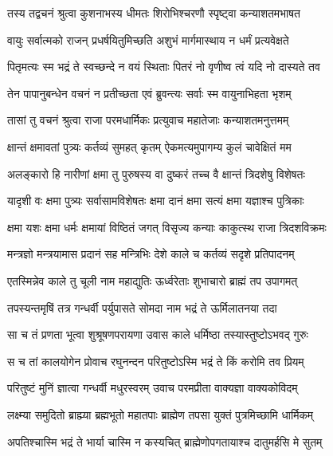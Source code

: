 
\twolineshloka
{तस्य तद्वचनं श्रुत्वा कुशनाभस्य धीमतः}
{शिरोभिश्चरणौ स्पृष्ट्वा कन्याशतमभाषत} %

\twolineshloka
{वायुः सर्वात्मको राजन् प्रधर्षयितुमिच्छति}
{अशुभं मार्गमास्थाय न धर्मं प्रत्यवेक्षते} %

\twolineshloka
{पितृमत्यः स्म भद्रं ते स्वच्छन्दे न वयं स्थिताः}
{पितरं नो वृणीष्व त्वं यदि नो दास्यते तव} %

\twolineshloka
{तेन पापानुबन्धेन वचनं न प्रतीच्छता}
{एवं ब्रुवन्त्यः सर्वाः स्म वायुनाभिहता भृशम्} %

\twolineshloka
{तासां तु वचनं श्रुत्वा राजा परमधार्मिकः}
{प्रत्युवाच महातेजाः कन्याशतमनुत्तमम्} %

\twolineshloka
{क्षान्तं क्षमावतां पुत्र्यः कर्तव्यं सुमहत् कृतम्}
{ऐकमत्यमुपागम्य कुलं चावेक्षितं मम} %

\twolineshloka
{अलङ्कारो हि नारीणां क्षमा तु पुरुषस्य वा}
{दुष्करं तच्च वै क्षान्तं त्रिदशेषु विशेषतः} %

\twolineshloka
{यादृशी वः क्षमा पुत्र्यः सर्वासामविशेषतः}
{क्षमा दानं क्षमा सत्यं क्षमा यज्ञाश्च पुत्रिकाः} %

\twolineshloka
{क्षमा यशः क्षमा धर्मः क्षमायां विष्ठितं जगत्}
{विसृज्य कन्याः काकुत्स्थ राजा त्रिदशविक्रमः} %

\twolineshloka
{मन्त्रज्ञो मन्त्रयामास प्रदानं सह मन्त्रिभिः}
{देशे काले च कर्तव्यं सदृशे प्रतिपादनम्} %

\twolineshloka
{एतस्मिन्नेव काले तु चूली नाम महाद्युतिः}
{ऊर्ध्वरेताः शुभाचारो ब्राह्मं तप उपागमत्} %

\twolineshloka
{तपस्यन्तमृषिं तत्र गन्धर्वी पर्युपासते}
{सोमदा नाम भद्रं ते ऊर्मिलातनया तदा} %

\twolineshloka
{सा च तं प्रणता भूत्वा शुश्रूषणपरायणा}
{उवास काले धर्मिष्ठा तस्यास्तुष्टोऽभवद् गुरुः} %

\twolineshloka
{स च तां कालयोगेन प्रोवाच रघुनन्दन}
{परितुष्टोऽस्मि भद्रं ते किं करोमि तव प्रियम्} %

\twolineshloka
{परितुष्टं मुनिं ज्ञात्वा गन्धर्वी मधुरस्वरम्}
{उवाच परमप्रीता वाक्यज्ञा वाक्यकोविदम्} %

\twolineshloka
{लक्ष्म्या समुदितो ब्राह्म्या ब्रह्मभूतो महातपाः}
{ब्राह्मेण तपसा युक्तं पुत्रमिच्छामि धार्मिकम्} %

\twolineshloka
{अपतिश्चास्मि भद्रं ते भार्या चास्मि न कस्यचित्}
{ब्राह्मेणोपगतायाश्च दातुमर्हसि मे सुतम्} %

